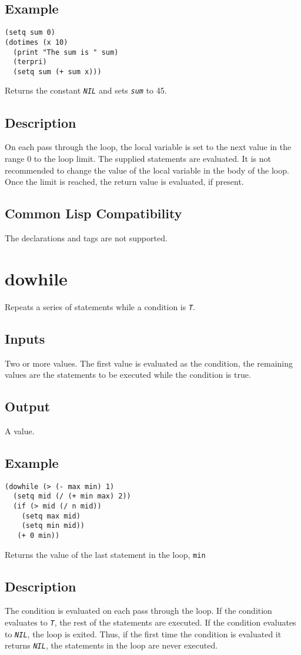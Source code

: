\documentclass[10pt, openany]{book}
\newcommand{\constant}[1]{\emph{\texttt{#1}}}
\newcommand{\keyword}[1]{\texttt{#1}}
\begin{document}
\subsection{Example}
\begin{lstlisting}
(setq sum 0)
(dotimes (x 10)
  (print "The sum is " sum)
  (terpri)
  (setq sum (+ sum x)))
\end{lstlisting}
Returns the constant \constant{NIL} and sets \constant{sum} to 45.
\subsection{Description}
On each pass through the loop, the local variable is set to the next value in the range 0 to the loop limit.  The supplied statements are evaluated.  It is not recommended to change the value of the local variable in the body of the loop.  Once the limit is reached, the return value is evaluated, if present.
\subsection{Common Lisp Compatibility}
The declarations and tags are not supported.

\section{dowhile}
Repeats a series of statements while a condition is \constant{T}.
\subsection{Inputs}
Two or more values.  The first value is evaluated as the condition, the remaining values are the statements to be executed while the condition is true.
\subsection{Output}
A value.
\subsection{Example}
\begin{lstlisting}
(dowhile (> (- max min) 1)
  (setq mid (/ (+ min max) 2))
  (if (> mid (/ n mid))
    (setq max mid)
    (setq min mid))
   (+ 0 min))
\end{lstlisting}
Returns the value of the last statement in the loop, \keyword{min}
\subsection{Description}
The condition is evaluated on each pass through the loop.  If the condition evaluates to \constant{T}, the rest of the statements are executed.  If the condition evaluates to \constant{NIL}, the loop is exited.  Thus, if the first time the condition is evaluated it returns \constant{NIL}, the statements in the loop are never executed.
\end{document}
